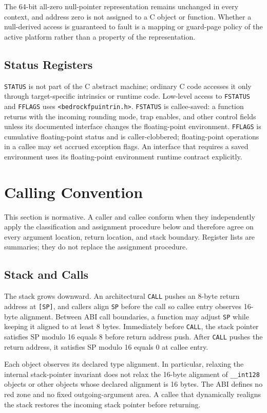 \documentclass[10pt,twoside]{article}
\begin{document}
The 64-bit all-zero null-pointer representation remains unchanged in every
context, and address zero is not assigned to a C object or function. Whether a
null-derived access is guaranteed to fault is a mapping or guard-page policy of
the active platform rather than a property of the representation.

\subsection{Status Registers}
\texttt{STATUS} is not part of the C abstract machine; ordinary C code accesses
it only through target-specific intrinsics or runtime code. Low-level access to
\texttt{FSTATUS} and \texttt{FFLAGS} uses
\texttt{<bedrockfpuintrin.h>}. \texttt{FSTATUS} is callee-saved: a function
returns with the incoming rounding mode, trap enables, and other control fields
unless its documented interface changes the floating-point environment.
\texttt{FFLAGS} is cumulative floating-point status and is caller-clobbered;
floating-point operations in a callee may set accrued exception flags. An
interface that requires a saved environment uses its floating-point environment
runtime contract explicitly.

\section{Calling Convention}\label{page:calling-convention}
This section is normative. A caller and callee conform when they independently
apply the classification and assignment procedure below and therefore agree on
every argument location, return location, and stack boundary. Register lists
are summaries; they do not replace the assignment procedure.

\subsection{Stack and Calls}
The stack grows downward. An architectural \texttt{CALL} pushes an
8-byte return address at \texttt{[SP]}, and
callers align \texttt{SP} before the call so callee entry observes
16-byte alignment. Between ABI call boundaries, a function
may adjust \texttt{SP} while keeping it aligned to at least
8 bytes. Immediately before \texttt{CALL}, the stack
pointer satisfies SP modulo 16 equals 8 before return address push. After \texttt{CALL} pushes the
return address, it satisfies SP modulo 16 equals 0 at callee entry.

Each object observes its declared type alignment. In particular, relaxing
the internal stack-pointer invariant does not relax the 16-byte alignment of
\texttt{\_\_int128} objects or other objects whose declared alignment is 16
bytes. The ABI defines no red zone and no fixed outgoing-argument area. A
callee that dynamically realigns the stack restores the incoming stack
pointer before returning.
\end{document}
